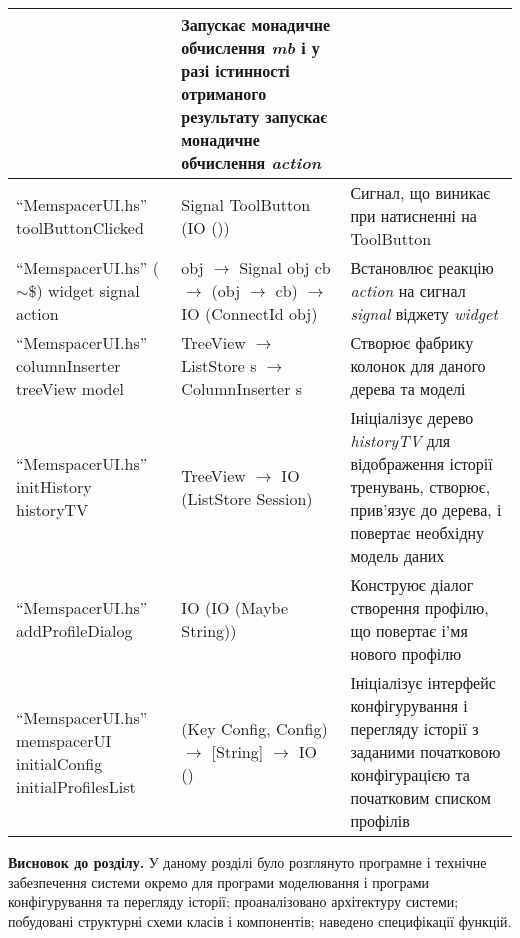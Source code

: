 \begin{longtable}{| C{6cm} | C{4cm} | C{5cm} |}
  & Запускає монадичне обчислення \emph{mb} і у разі істинності
  отриманого результату запускає монадичне обчислення \emph{action} \\
  \hline
  ``MemspacerUI.hs'' \newline toolButtonClicked
  & Signal ToolButton (IO ())
  & Сигнал, що виникає при натисненні на ToolButton \\
  \hline
  ``MemspacerUI.hs'' \newline ($\sim$\$) \newline widget signal action
  & obj \newline $\to$ Signal obj cb \newline
  $\to$ (obj $\to$ cb) \newline $\to$ IO (ConnectId obj)
  & Встановлює реакцію \emph{action} на сигнал \emph{signal} віджету \emph{widget} \\
  \hline
  ``MemspacerUI.hs'' \newline columnInserter \newline treeView model
  & TreeView \newline $\to$ ListStore s $\to$ ColumnInserter s
  & Створює фабрику колонок для даного дерева та моделі \\
  \hline
  ``MemspacerUI.hs'' \newline initHistory \newline historyTV
  & TreeView $\to$ IO (ListStore Session)
  & Ініціалізує дерево \emph{historyTV} для відображення історії тренувань,
  створює, прив'язує до дерева, і повертає необхідну модель даних \\
  \hline
  ``MemspacerUI.hs'' \newline addProfileDialog
  & IO (IO (Maybe String))
  & Конструює діалог створення профілю, що повертає і'мя нового профілю \\
  \hline
  ``MemspacerUI.hs'' \newline memspacerUI \newline
  initialConfig initialProfilesList
  & (Key Config, Config) $\to$ [String] $\to$ IO ()
  & Ініціалізує інтерфейс конфігурування і перегляду історії
  з заданими початковою конфігурацією та початковим списком профілів \\
  \hline
\end{longtable}\normalsize

\textbf{Висновок до розділу.} У даному розділі було розглянуто програмне і технічне забезпечення системи окремо для програми моделювання і програми конфігурування та перегляду історії; проаналізовано архітектуру системи; побудовані структурні схеми класів і компонентів; наведено специфікації функцій.